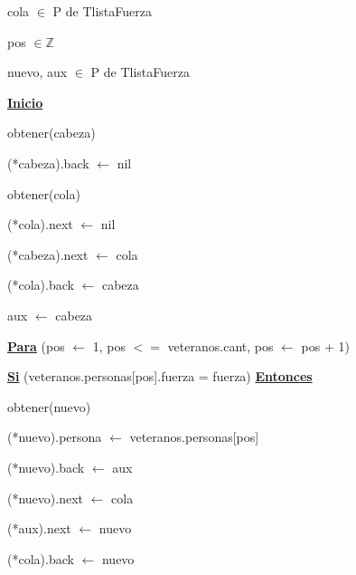 \documentclass{article}
\begin{document}
            \hspace{12mm}cola $\in$ P de TlistaFuerza

            \hspace{12mm}pos $\in \mathbb{Z}$

            \hspace{12mm}nuevo, aux $\in$ P de TlistaFuerza

        \hspace{8mm}\underline{\textbf{Inicio}}

            \hspace{12mm}obtener(cabeza)

            \hspace{12mm}(*cabeza).back $\leftarrow$ nil

            \hspace{12mm}obtener(cola)

            \hspace{12mm}(*cola).next $\leftarrow$ nil

            \hspace{12mm}(*cabeza).next $\leftarrow$ cola

            \hspace{12mm}(*cola).back $\leftarrow$ cabeza

            \hspace{12mm}aux $\leftarrow$ cabeza

            \hspace{12mm}\underline{\textbf{Para}} (pos $\leftarrow$ 1, pos $<=$ veteranos.cant, pos $\leftarrow$ pos + 1)

                \hspace{16mm}\underline{\textbf{Si}} (veteranos.personas[pos].fuerza = fuerza) \underline{\textbf{Entonces}}

                    \hspace{20mm}obtener(nuevo)

                    \hspace{20mm}(*nuevo).persona $\leftarrow$ veteranos.personas[pos]

                    \hspace{20mm}(*nuevo).back $\leftarrow$ aux

                    \hspace{20mm}(*nuevo).next $\leftarrow$ cola

                    \hspace{20mm}(*aux).next $\leftarrow$ nuevo

                    \hspace{20mm}(*cola).back $\leftarrow$ nuevo
\end{document}
